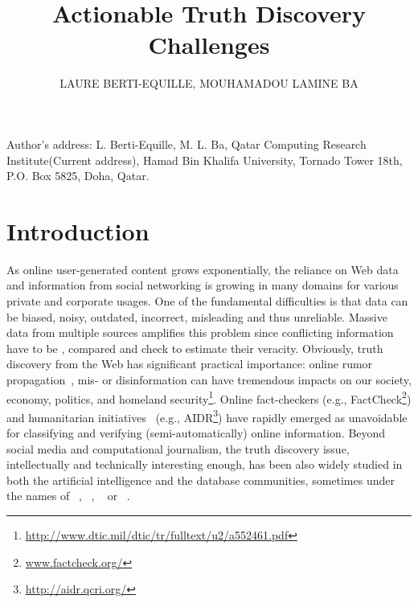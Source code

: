 \documentclass[prodmode,acmtecs]{acmsmall} %
\begin{document}
\title{Actionable Truth Discovery Challenges}
\author{LAURE BERTI-EQUILLE, MOUHAMADOU LAMINE BA
}



\begin{bottomstuff}
Author's address: L. Berti-Equille, M. L. Ba, Qatar Computing Research Institute(Current address), Hamad
Bin Khalifa University, Tornado Tower 18th, P.O. Box 5825, Doha, Qatar.
\end{bottomstuff}

\maketitle


\section{Introduction}
As online user-generated content grows exponentially, the reliance on Web data and information from social 
networking is growing in many domains for various private and corporate usages. 
One of the fundamental difficulties is that data can be biased, noisy, outdated, incorrect, misleading and
thus unreliable. Massive data from multiple sources amplifies this problem since conflicting information
have to be , compared  and check to estimate their veracity. Obviously, truth discovery from 
the Web has significant practical importance: online rumor propagation~\cite{rumor-icdm2013}, mis- or disinformation
can have tremendous impacts on our society, economy, politics, and homeland security\footnote{\tiny{\url{http://www.dtic.mil/dtic/tr/fulltext/u2/a552461.pdf}}}. 
Online fact-checkers (e.g., FactCheck\footnote{\tiny{\url{www.factcheck.org/}}}) and humanitarian initiatives~\cite{ImranECDM13}
(e.g., AIDR\footnote{\tiny{\url{http://aidr.qcri.org/}}}) have rapidly emerged as unavoidable for classifying and verifying 
(semi-automatically) online information. Beyond social media and computational journalism, the truth discovery issue, intellectually 
and technically interesting enough, has been also widely studied in both the artificial intelligence and the database communities,
sometimes under the names of  ~\cite{GoasdoueKKLMZ13}, ~\cite{Thirunarayan2014182},
~\cite{PasternackR13} or ~\cite{GallandAMS10}. 
\end{document}
